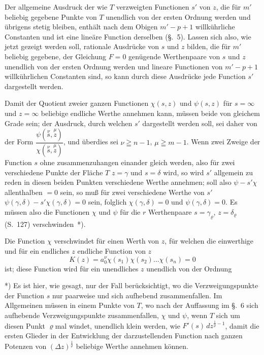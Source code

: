 \documentclass{article}
\begin{document}
Der allgemeine Ausdruck der wie $T$ verzweigten Functionen $s'$ von $z$, die für $m'$ beliebig gegebene Punkte von $T$ unendlich von der ersten Ordnung werden und übrigens stetig bleiben, enthält nach dem Obigen $m'-p+1$ willkührliche Constanten und ist eine lineäre Function derselben (§.~5). Lassen sich also, wie jetzt gezeigt werden soll, rationale Ausdrücke von $s$ und $z$ bilden, die für $m'$ beliebig gegebene, der Gleichung $F = 0$ genügende Werthenpaare von $s$ und $z$ unendlich von der ersten Ordnung werden und lineare Functionen von $m'-p+1$ willkührlichen Constanten sind, so kann durch diese Ausdrücke jede Function $s'$ dargestellt werden.

Damit der Quotient zweier ganzen Functionen $\chi(s, z)$ und $\psi(s, z)$ für $s = \infty$ und $z = \infty$ beliebige endliche Werthe annehmen kann, müssen beide von gleichem Grade sein; der Ausdruck, durch welchen $s'$ dargestellt werden soll, sei daher von der Form $\dfrac{\psi(\overset{\nu}{s}, \overset{\mu}{z})}{\chi(\overset{\nu}{s}, \overset{\mu}{z})}$, und überdies sei $\nu \geqq n-1$, $\mu \geqq m-1$. Wenn zwei Zweige der Function $s$ ohne zusammenzuhangen einander gleich werden, also für zwei verschiedene Punkte der Fläche $T$ $z = \gamma$ und $s = \delta$ wird, so wird $s'$ allgemein zu reden in diesen beiden Punkten verschiedene Werthe annehmen; soll also $\psi - s'\chi$ allenthalben $= 0$ sein, so muß für zwei verschiedene Werthe von $s'$ $\psi(\gamma, \delta) - s'\chi(\gamma, \delta) = 0$ sein, folglich $\chi(\gamma, \delta) = 0$ und $\psi(\gamma, \delta) = 0$. Es müssen also die Functionen $\chi$ und $\psi$ für die $r$ Werthenpaare $s = \gamma_{\varrho}$, $z = \delta_{\varrho}$ (S.~127) verschwinden~*).

Die Function $\chi$ verschwindet für einen Werth von $z$, für welchen die einwerthige und für ein endliches $z$ endliche Function von $z$
\[ K(z) = a_{0}^{\nu} \chi(s_{1}) \chi(s_{2}) \ldots \chi(s_{n}) = 0 \]
ist; diese Function wird für ein unendliches $z$ unendlich von der Ordnung

*) Es ist hier, wie gesagt, nur der Fall berücksichtigt, wo die Verzweigungspunkte der Function $s$ nur paarweise und sich aufhebend zusammenfallen. Im Allgemeinen müssen in einem Punkte von $T$, wo nach der Auffassung im §.~6 sich aufhebende Verzweigungspunkte zusammenfallen, $\chi$ und $\psi$, wenn $T$ sich um diesen Punkt $\varrho$mal windet, unendlich klein werden, wie $F'(s)\, dz^{\frac{1}{\varrho}-1}$, damit die ersten Glieder in der Entwicklung der darzustellenden Function nach ganzen Potenzen von $(\Delta z)^{\frac{1}{\varrho}}$ beliebige Werthe annehmen können.
\end{document}
